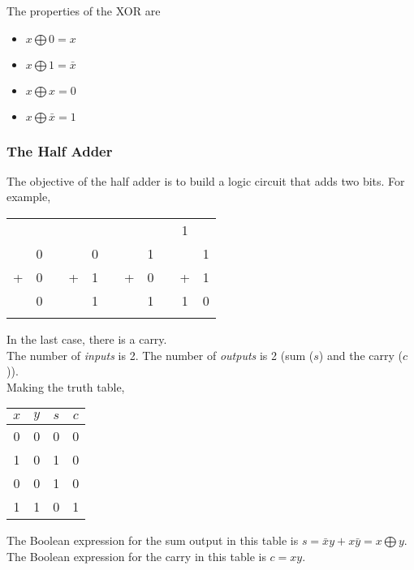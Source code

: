 \documentclass[]{article}
\begin{document}
The properties of the XOR are\\

\begin{itemize}
	\item $x \bigoplus 0 = x$
	\item $x \bigoplus 1 = \bar{x}$
	\item $x \bigoplus x = 0$
	\item $x \bigoplus \bar{x} = 1$
\end{itemize}\bigbreak


\subsubsection{The Half Adder}
\bigbreak

The objective of the half adder is to build a logic circuit that adds two bits. For example, 

\begin{center}
	\begin{tabular}{ccccccccccc}
		  &   &  &   &   &  &   &   &  & \tiny 1 &   \\
		  & 0 &  &   & 0 &  &   & 1 &  &   & 1 \\
		+ & 0 &  & + & 1 &  & + & 0 &  & + & 1 \\\cline{1-2}\cline{4-5}\cline{7-8}\cline{10-11}
		  & 0 &  &   & 1 &  &   & 1 &  & 1 & 0 \\\smallskip
	\end{tabular}
\end{center}\bigbreak

In the last case, there is a carry.\\

The number of \textit{inputs} is 2. The number of \textit{outputs} is 2 (sum ($s$) and the carry ($c$)).\\

Making the truth table, 

\begin{center}
	\begin{tabular}{|c|c||c|c|}
		$x$ & $y$ & $s$ & $c$	\\\hline
		0 & 0 & 0 & 0	\\
		1 & 0 & 1 & 0	\\
		0 & 0 & 1 & 0	\\
		1 & 1 & 0 & 1	\\
	\end{tabular}
	\bigbreak
\end{center}

The Boolean expression for the sum output in this table is $s = \bar{x}y + x\bar{y} = x \bigoplus y$. The Boolean expression for the carry in this table is $c = xy$.\\
\end{document}
